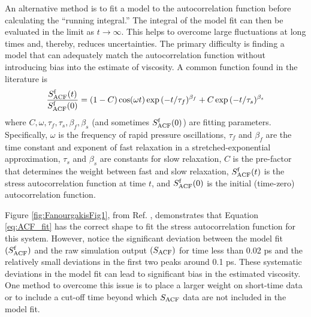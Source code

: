 \documentclass[9pt,bestpractices]{livecoms}
\begin{document}
An alternative method is to fit a model to the autocorrelation function before calculating the ``running integral.'' The integral of the model fit can then be evaluated in the limit as $t \to \infty$. This helps to overcome large fluctuations at long times and, thereby, reduces uncertainties. The primary difficulty is finding a model that can adequately match the autocorrelation function without introducing bias into the estimate of viscosity. A common function found in the literature is \cite{GROMACS,GUANG2002}
\begin{equation} \label{eq:ACF_fit}
\frac{S^{\rm f}_{\rm ACF}(t)}{S^{\rm f}_{\rm ACF}(0)} = (1-C)\cos(\omega t)\exp{(-t/\tau_f)^{\beta_f}} + C\exp{(-t/\tau_s)^{\beta_s}}
\end{equation}
where $C, \omega, \tau_f, \tau_s, \beta_f, \beta_s$ (and sometimes $S^{\rm f}_{\rm ACF}(0)$) are fitting parameters. Specifically, $\omega$ is the frequency of rapid pressure oscillations, $\tau_f$ and $\beta_f$ are the time constant and exponent of fast relaxation in a stretched-exponential approximation, $\tau_s$ and $\beta_s$ are constants for slow relaxation, $C$ is the pre-factor that determines the weight between fast and slow relaxation, $S^{\rm f}_{\rm ACF}(t)$ is the stress autocorrelation function at time $t$, and $S^{\rm f}_{\rm ACF}(0)$ is the initial (time-zero) autocorrelation function.


Figure \ref{fig:FanourgakisFig1}, from Ref. \cite{Fanourgakis2012}, demonstrates that Equation \ref{eq:ACF_fit} has the correct shape to fit the stress autocorrelation function for this system. However, notice the significant deviation between the model fit $(S^{\rm f}_{\rm ACF})$ and the raw simulation output $(S_{\rm ACF})$ for time less than 0.02 ps and the relatively small deviations in the first two peaks around 0.1 ps. These systematic deviations in the model fit can lead to significant bias in the estimated viscosity. One method to overcome this issue is to place a larger weight on short-time data or to include a cut-off time beyond which $S_{\rm ACF}$ data are not included in the model fit.
\end{document}
